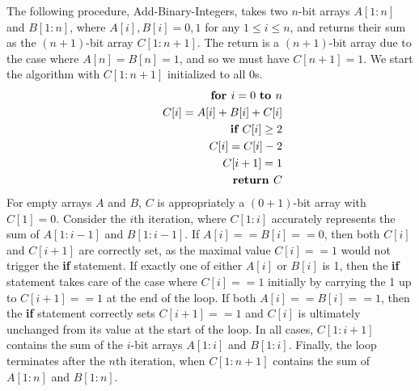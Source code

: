 \subsubsection{}
    The following procedure, Add-Binary-Integers, takes two $n$-bit arrays $A[1:n]$ and $B[1:n]$, where $A[i],B[i] = 0,1$ for any $1\le i\le n$, and returns their sum as the $(n+1)$-bit array $C[1:n+1]$.  The return is a $(n+1)$-bit array due to the case where $A[n]=B[n]=1$, and so we must have $C[n+1]=1$.  We start the algorithm with $C[1:n+1]$ initialized to all 0s.
    \begin{eqnarray}
        &\,& \text{\bf for } i = 0 \text{ \bf to } n
        \\ \nonumber &\,& \quad C[i] = A[i] + B[i] + C[i]
        \\ \nonumber &\,& \qquad \text{\bf if } C[i] \ge 2
        \\ \nonumber &\,& \qquad \quad C[i] = C[i] - 2
        \\ \nonumber &\,& \qquad \quad C[i+1] = 1
        \\ \nonumber &\,& \text{\bf return } C
    \end{eqnarray}
    For empty arrays $A$ and $B$, $C$ is appropriately a $(0+1)$-bit array with $C[1] = 0$.  Consider the $i$th iteration, where $C[1:i]$ accurately represents the sum of $A[1:i-1]$ and $B[1:i-1]$.  If $A[i] == B[i] == 0$, then both $C[i]$ and $C[i+1]$ are correctly set, as the maximal value $C[i] == 1$ would not trigger the {\bf if} statement.  If exactly one of either $A[i]$ or $B[i]$ is 1, then the {\bf if} statement takes care of the case where $C[i] == 1$ initially by carrying the 1 up to $C[i + 1] == 1$ at the end of the loop.  If both $A[i] == B[i] == 1$, then the {\bf if} statement correctly sets $C[i + 1] == 1$ and $C[i]$ is ultimately unchanged from its value at the start of the loop.  In all cases, $C[1:i+1]$ contains the sum of the $i$-bit arrays $A[1:i]$ and $B[1:i]$.  Finally, the loop terminates after the $n$th iteration, when $C[1:n + 1]$ contains the sum of $A[1:n]$ and $B[1:n]$.